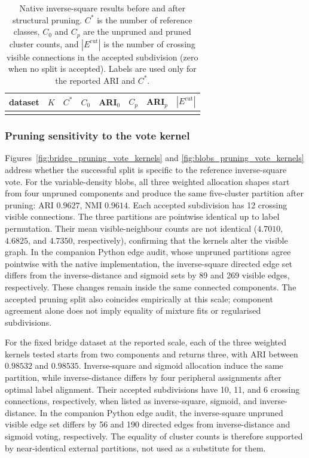 \documentclass[pdflatex,sn-basic,Numbered]{sn-jnl}
\begin{document}
\begin{table}[t]
\caption{Native inverse-square results before and after structural pruning. $C^*$
is the number of reference classes, $C_0$ and $C_p$ are the unpruned and pruned
cluster counts, and $|E^{\mathrm{cut}}|$ is the number of crossing visible
connections in the accepted subdivision (zero when no split is accepted).
Labels are used only for the reported ARI and $C^*$.}
\label{tab:native_structural_pruning}
\centering
\small
\begin{tabular}{lrrrrrrr}
\toprule
dataset & $K$ & $C^*$ & $C_0$ & ARI$_0$ & $C_p$ & ARI$_p$ & $|E^{\mathrm{cut}}|$\\
\midrule
\\
\bottomrule
\end{tabular}
\end{table}

\subsubsection{Pruning sensitivity to the vote kernel}

Figures~\ref{fig:bridge_pruning_vote_kernels} and
\ref{fig:blobs_pruning_vote_kernels} address whether the successful split is
specific to the reference inverse-square vote.  For the variable-density
blobs, all three weighted allocation shapes start from four unpruned components and
produce the same five-cluster partition after pruning: ARI $0.9627$, NMI
$0.9614$.  Each accepted subdivision has 12 crossing visible connections.
The three partitions are pointwise
identical up to label permutation.  Their mean visible-neighbour counts are
not identical ($4.7010$, $4.6825$, and $4.7350$, respectively), confirming
that the kernels alter the visible graph.  In the companion Python edge audit,
whose unpruned partitions agree pointwise with the native implementation, the inverse-square directed
edge set differs from the inverse-distance and sigmoid sets by 89 and 269
visible edges, respectively.  These changes remain inside the same connected
components. The accepted pruning split also coincides empirically at this
scale; component agreement alone does not imply equality of mixture fits or
regularised subdivisions.

For the fixed bridge dataset at the reported scale, each of the three weighted
kernels tested starts from two components and returns three, with ARI between
$0.98532$ and $0.98535$.  Inverse-square and sigmoid allocation induce the same
partition, while inverse-distance differs by four peripheral assignments after
optimal label alignment.  Their accepted subdivisions have 10, 11, and 6 crossing connections,
respectively, when listed as inverse-square, sigmoid, and inverse-distance. In
the companion Python edge audit, the inverse-square unpruned visible edge set
differs by 56 and 190 directed edges from inverse-distance and sigmoid voting,
respectively.  The equality of cluster counts is
therefore supported by near-identical external partitions, not used as a
substitute for them.
\end{document}
